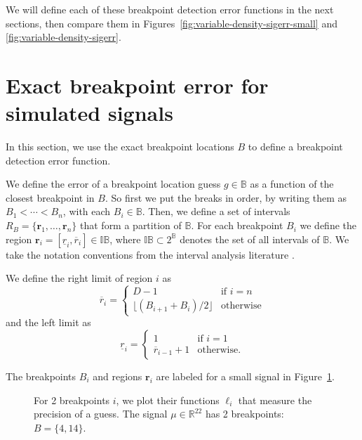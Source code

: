 \documentclass{jsfds} %
\renewcommand{\r}{ \mathbf{ r} }
\newcommand{\rileft}[1][i]{\underline r_{#1}}
\newcommand{\riright}[1][i]{\overline r_{#1}}
\newcommand{\RR}{\mathbb{R}}
\begin{document}
We will define each of these breakpoint detection error functions in
the next sections, then compare them in
Figures~\ref{fig:variable-density-sigerr-small} and
\ref{fig:variable-density-sigerr}.

\newpage

\section{Exact breakpoint error for simulated signals}
\label{sec:breakpoint_error}

In this section, we use the exact breakpoint locations $B$ to define a
breakpoint detection error function.

We define the error of a breakpoint location guess $g\in\mathbb
B$ as a function of the closest breakpoint in $B$. So
first we put the breaks in order, by writing them as $B_1<\cdots<
B_n$, with each $B_i\in\mathbb B$. Then, we define a set of intervals
$R_B=\{\r_1,\dots,\r_n\}$ that form a partition of $\mathbb B$. For each
breakpoint $B_i$ we define the region
${\r}_i=[\rileft,\riright]\in\mathbb I \mathbb B$, where $\mathbb
I\mathbb B\subset 2^{\mathbb B}$ denotes the set of all intervals of
$\mathbb B$. We take the notation conventions from the interval
analysis literature \citep{intervals}.

We define the right limit of region $i$ as
\begin{equation}
  \label{eq:R_i}
\riright
=
  \begin{cases}
    D-1 & \text{if } i=n \\
    \lfloor (B_{i+1}+B_i)/2 \rfloor & \text{otherwise}
  \end{cases}
\end{equation}
and
the left limit as
\begin{equation}
  \label{eq:L_i}
  \rileft =
  \begin{cases}
    1 & \text{if } i=1 \\
    \riright[i-1]+1 & \text{otherwise}.
  \end{cases}
\end{equation}

The breakpoints $B_i$ and regions $\r_i$ are labeled for a small
signal in Figure~\ref{fig:exact_imprecision}.

\begin{figure}[b]
  \centering
  
  \caption{For 2 breakpoints $i$, we plot their functions $\ell_i$
    that measure the precision of a guess.
    The signal $\mu\in\RR^{22}$ has 2 breakpoints: $B=\{4,14\}$.}
  \label{fig:exact_imprecision}
\end{figure}
\end{document}
